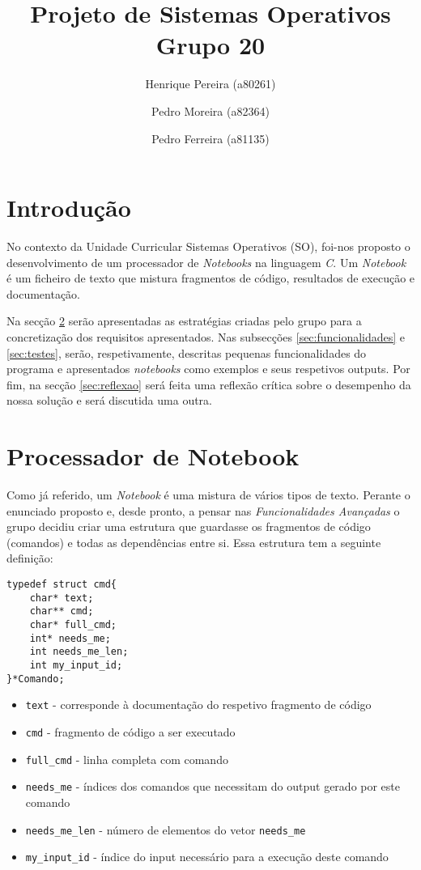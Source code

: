 \documentclass[a4paper]{article}
\title{Projeto de Sistemas Operativos\\Grupo 20}
\author{Henrique Pereira (a80261) \and Pedro Moreira (a82364) \and Pedro Ferreira (a81135) }
\begin{document}
\maketitle

\newpage

\tableofcontents

\newpage

\section{Introdução}
\label{sec:intro}

No contexto da Unidade Curricular Sistemas Operativos (SO), foi-nos proposto o desenvolvimento de um processador de \textit{Notebooks} na linguagem \textit{C}. 
Um \textit{Notebook} é um ficheiro de texto que mistura fragmentos de código, resultados de execução e documentação. 


Na secção \ref{sec:note} serão apresentadas as estratégias criadas pelo grupo para a concretização dos requisitos apresentados.
Nas subsecções \ref{sec:funcionalidades} e \ref{sec:testes}, serão, respetivamente, descritas pequenas funcionalidades do programa e 
apresentados \textit{notebooks} como exemplos e seus respetivos outputs.
Por fim, na secção \ref{sec:reflexao} será feita uma reflexão crítica sobre o desempenho da nossa solução e será discutida uma outra.


\section{Processador de Notebook}
\label{sec:note}

Como já referido, um \textit{Notebook} é uma mistura de vários tipos de texto. Perante o enunciado proposto e, desde pronto, a pensar 
nas \textit{Funcionalidades Avançadas} o grupo decidiu criar uma estrutura que guardasse os fragmentos de código (comandos) e todas as 
dependências entre si.
Essa estrutura tem a seguinte definição: 

\begin{lstlisting}[caption=Definição da estrutura]
typedef struct cmd{
    char* text;
    char** cmd;
    char* full_cmd; 
    int* needs_me;
    int needs_me_len;
    int my_input_id;
}*Comando;
\end{lstlisting}

\begin{itemize}
  \item{\texttt{text} - corresponde à documentação do respetivo fragmento de código}
  \item{\texttt{cmd} - fragmento de código a ser executado}
  \item{\texttt{full\_cmd} - linha completa com comando}
  \item{\texttt{needs\_me} - índices dos comandos que necessitam do output gerado por este comando}
  \item{\texttt{needs\_me\_len} - número de elementos do vetor \texttt{needs\_me}} 
  \item{\texttt{my\_input\_id} - índice do input necessário para a execução deste comando}
\end{itemize}
\end{document}
